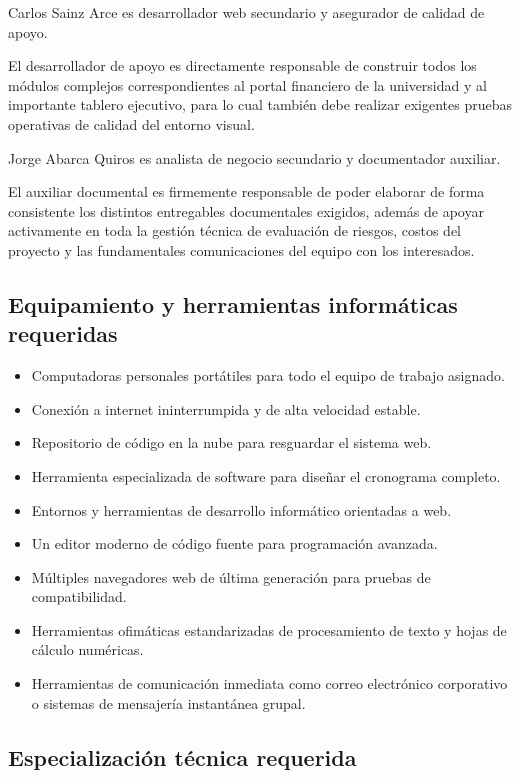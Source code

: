 \documentclass[11pt,spanish]{article}
\begin{document}
Carlos Sainz Arce es desarrollador web secundario y asegurador de calidad de apoyo.

El desarrollador de apoyo es directamente responsable de construir todos los módulos complejos correspondientes al portal financiero de la universidad y al importante tablero ejecutivo, para lo cual también debe realizar exigentes pruebas operativas de calidad del entorno visual.

Jorge Abarca Quiros es analista de negocio secundario y documentador auxiliar.

El auxiliar documental es firmemente responsable de poder elaborar de forma consistente los distintos entregables documentales exigidos, además de apoyar activamente en toda la gestión técnica de evaluación de riesgos, costos del proyecto y las fundamentales comunicaciones del equipo con los interesados.

\subsection{Equipamiento y herramientas informáticas requeridas}

\begin{itemize}
    \item Computadoras personales portátiles para todo el equipo de trabajo asignado.
    \item Conexión a internet ininterrumpida y de alta velocidad estable.
    \item Repositorio de código en la nube para resguardar el sistema web.
    \item Herramienta especializada de software para diseñar el cronograma completo.
    \item Entornos y herramientas de desarrollo informático orientadas a web.
    \item Un editor moderno de código fuente para programación avanzada.
    \item Múltiples navegadores web de última generación para pruebas de compatibilidad.
    \item Herramientas ofimáticas estandarizadas de procesamiento de texto y hojas de cálculo numéricas.
    \item Herramientas de comunicación inmediata como correo electrónico corporativo o sistemas de mensajería instantánea grupal.
\end{itemize}

\subsection{Especialización técnica requerida}
\end{document}
